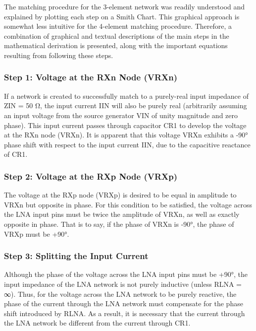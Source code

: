       The matching procedure for the 3-element network was readily understood and explained by 
      plotting each step on a Smith Chart. This graphical approach is somewhat less intuitive for 
      the 4-element matching procedure. Therefore, a combination of graphical and textual 
      descriptions of the main steps in the mathematical derivation is presented, along with the 
      important equations resulting from following these steps.
       
      \subsubsection{Step 1: Voltage at the RXn Node (VRXn)}
        If a network is created to successfully match to a purely-real input impedance of ZIN = 50 
        Ω, the input current IIN will also be purely real (arbitrarily assuming an input voltage 
        from the source generator VIN of unity magnitude and zero phase). This input current passes 
        through capacitor CR1 to develop the voltage at the RXn node (VRXn). It is apparent that 
        this voltage VRXn exhibits a -90° phase shift with respect to the input current IIN, due to 
        the capacitive reactance of CR1.
        
      \subsubsection{Step 2: Voltage at the RXp Node (VRXp)}
        The voltage at the RXp node (VRXp) is desired to be equal in amplitude to VRXn but opposite 
        in phase. For this condition to be satisfied, the voltage across the LNA input pins must be 
        twice the amplitude of VRXn, as well as exactly opposite in phase. That is to say, if the 
        phase of VRXn is -90°, the phase of VRXp must be +90°.
        
      \subsubsection{Step 3: Splitting the Input Current}
        Although the phase of the voltage across the LNA input pins must be +90°, the input 
        impedance of the LNA network is not purely inductive (unless RLNA = ∞). Thus, for the 
        voltage across the LNA network to be purely reactive, the phase of the current through the 
        LNA network must compensate for the phase shift introduced by RLNA. As a result, it is 
        necessary that the current through the LNA network be different from the current through 
        CR1.
        
